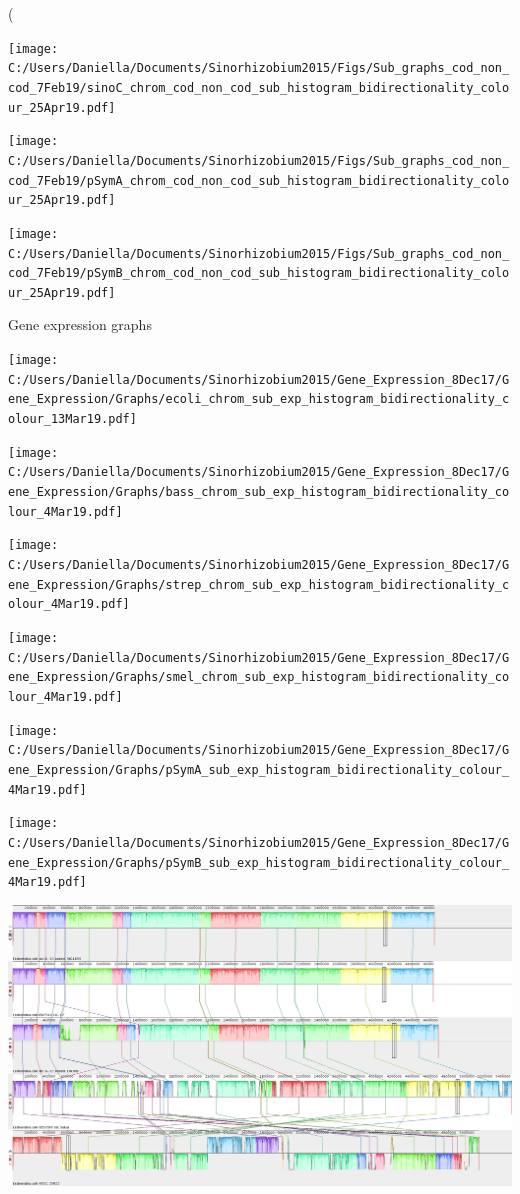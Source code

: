 \left( \documentclass[12pt]{article}
\begin{document}
\texttt{[image: C:/Users/Daniella/Documents/Sinorhizobium2015/Figs/Sub\_graphs\_cod\_non\_cod\_7Feb19/sinoC\_chrom\_cod\_non\_cod\_sub\_histogram\_bidirectionality\_colour\_25Apr19.pdf]}

\texttt{[image: C:/Users/Daniella/Documents/Sinorhizobium2015/Figs/Sub\_graphs\_cod\_non\_cod\_7Feb19/pSymA\_chrom\_cod\_non\_cod\_sub\_histogram\_bidirectionality\_colour\_25Apr19.pdf]}

\texttt{[image: C:/Users/Daniella/Documents/Sinorhizobium2015/Figs/Sub\_graphs\_cod\_non\_cod\_7Feb19/pSymB\_chrom\_cod\_non\_cod\_sub\_histogram\_bidirectionality\_colour\_25Apr19.pdf]}

Gene expression graphs

\texttt{[image: C:/Users/Daniella/Documents/Sinorhizobium2015/Gene\_Expression\_8Dec17/Gene\_Expression/Graphs/ecoli\_chrom\_sub\_exp\_histogram\_bidirectionality\_colour\_13Mar19.pdf]}

\texttt{[image: C:/Users/Daniella/Documents/Sinorhizobium2015/Gene\_Expression\_8Dec17/Gene\_Expression/Graphs/bass\_chrom\_sub\_exp\_histogram\_bidirectionality\_colour\_4Mar19.pdf]}

\texttt{[image: C:/Users/Daniella/Documents/Sinorhizobium2015/Gene\_Expression\_8Dec17/Gene\_Expression/Graphs/strep\_chrom\_sub\_exp\_histogram\_bidirectionality\_colour\_4Mar19.pdf]}

\texttt{[image: C:/Users/Daniella/Documents/Sinorhizobium2015/Gene\_Expression\_8Dec17/Gene\_Expression/Graphs/smel\_chrom\_sub\_exp\_histogram\_bidirectionality\_colour\_4Mar19.pdf]}

\texttt{[image: C:/Users/Daniella/Documents/Sinorhizobium2015/Gene\_Expression\_8Dec17/Gene\_Expression/Graphs/pSymA\_sub\_exp\_histogram\_bidirectionality\_colour\_4Mar19.pdf]}

\texttt{[image: C:/Users/Daniella/Documents/Sinorhizobium2015/Gene\_Expression\_8Dec17/Gene\_Expression/Graphs/pSymB\_sub\_exp\_histogram\_bidirectionality\_colour\_4Mar19.pdf]}




\includegraphics[width=\textwidth]{Mauve_aln_pic_17Dec18.jpg}
\end{document}
